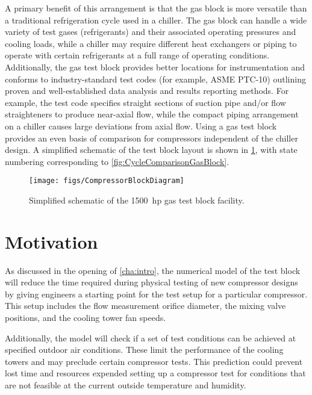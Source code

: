 A primary benefit of this arrangement is that the gas block is 
more versatile than a traditional refrigeration cycle used in a chiller. 
The gas block can handle a wide variety of test gases (refrigerants) 
and their associated operating pressures and cooling loads, 
while a chiller may require different heat exchangers or piping 
to operate with certain refrigerants at a full range of operating conditions.
Additionally, the gas test block provides better locations for instrumentation 
and conforms to industry-standard test codes (for example, ASME%
PTC-10) 
outlining proven and well-established data analysis and results reporting methods. 
For example, the test code specifies straight sections of suction pipe and/or flow straighteners 
to produce near-axial flow, while the compact piping arrangement on a chiller causes large deviations from axial flow. 
Using a gas test block provides an even basis of comparison for compressors independent of the chiller design. 
A simplified schematic of the test block layout is shown in \cref{fig:SimpSchematic}, 
with state numbering corresponding to \cref{fig:CycleComparisonGasBlock}. 
\begin{figure}[htbp]
	\centering
	\texttt{[image: figs/CompressorBlockDiagram]}
	\caption{Simplified schematic of the \SI{1500}{hp} gas test block facility.}
	\label{fig:SimpSchematic}
\end{figure}

\section{Motivation} \label{sec:motivation}
As discussed in the opening of \cref{cha:intro}, 
the numerical model of the test block will reduce the time required during physical testing of new compressor designs 
by giving engineers a starting point for the test setup for a particular compressor. 
This setup includes the flow measurement orifice diameter, the mixing valve positions, and the cooling tower fan speeds.

Additionally, the model will check if a set of test conditions 
can be achieved at specified outdoor air conditions. 
These limit the performance of the cooling towers and may preclude certain compressor tests. 
This prediction could prevent lost time and resources expended setting up a compressor test 
for conditions that are not feasible at the current outside temperature and humidity.

